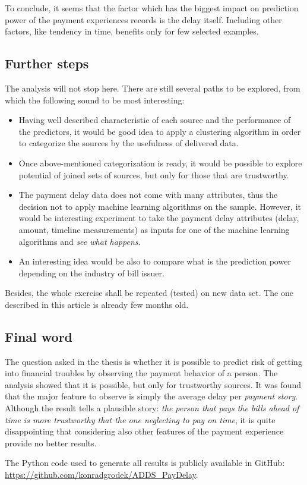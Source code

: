 \documentclass{article}
\begin{document}
\par To conclude, it seems that the factor which has the biggest impact on prediction power of the payment experiences records is the delay itself.
Including other factors, like tendency in time, benefits only for few selected examples.

\subsection{Further steps}

The analysis will not stop here.
There are still several paths to be explored, from which the following sound to be most interesting:
\begin{itemize}
    \item Having well described characteristic of each source and the performance of the predictors, it would be good idea to apply a clustering algorithm in order to categorize the sources by the usefulness of delivered data.
    \item Once above-mentioned categorization is ready, it would be possible to explore potential of joined sets of sources, but only for those that are trustworthy.
    \item The payment delay data does not come with many attributes, thus the decision not to apply machine learning algorithms on the sample. However, it would be interesting experiment to take the payment delay attributes (delay, amount, timeline measurements) as inputs for one of the machine learning algorithms and \textit{see what happens}.
    \item An interesting idea would be also to compare what is the prediction power depending on the industry of bill issuer.
\end{itemize}

Besides, the whole exercise shall be repeated (tested) on new data set.
The one described in this article is already few months old.

\subsection{Final word}

The question asked in the thesis is whether it is possible to predict risk of getting into financial troubles by observing the payment behavior of a person.
The analysis showed that it is possible, but only for trustworthy sources.
It was found that the major feature to observe is simply the average delay per \textit{payment story}.
Although the result tells a plausible story: \textit{the person that pays the bills ahead of time is more trustworthy that the one neglecting to pay on time},
it is quite disappointing that considering also other features of the payment experience provide no better results.

\par The Python code used to generate all results is publicly available in GitHub: \url{https://github.com/konradgrodek/ADDS_PayDelay}.

\printbibliography
\end{document}
